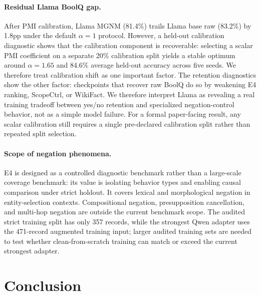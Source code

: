 \documentclass[letterpaper]{article}
\begin{document}
\paragraph{Residual Llama BoolQ gap.}
After PMI calibration, Llama MGNM (81.4\%) trails Llama base raw (83.2\%)
by 1.8pp under the default $\alpha=1$ protocol. However, a held-out calibration
diagnostic shows that the calibration component is recoverable: selecting a scalar PMI
coefficient on a separate 20\% calibration split yields a stable optimum around
$\alpha=1.65$ and 84.6\% average held-out accuracy across five seeds. We
therefore treat calibration shift as one important factor. The retention
diagnostics show the other factor: checkpoints that recover raw BoolQ do so by
weakening E4 ranking, ScopeCtrl, or WikiFact. We therefore interpret Llama as
revealing a real training tradeoff between yes/no retention and specialized
negation-control behavior, not as a simple model failure. For a formal
paper-facing result, any scalar calibration still requires a single pre-declared
calibration split rather than repeated split selection.

\paragraph{Scope of negation phenomena.}
E4 is designed as a controlled diagnostic benchmark rather than a large-scale
coverage benchmark: its value is isolating behavior types and enabling causal
comparison under strict holdout. It covers lexical and morphological negation
in entity-selection contexts.
Compositional negation, presupposition cancellation, and multi-hop negation
are outside the current benchmark scope. The audited strict training split has
only 357 records, while the strongest Qwen adapter uses the 471-record augmented
training input; larger audited training sets are needed to test whether clean-from-scratch
training can match or exceed the current strongest adapter.

\section{Conclusion}
\label{sec:conclusion}
\end{document}
